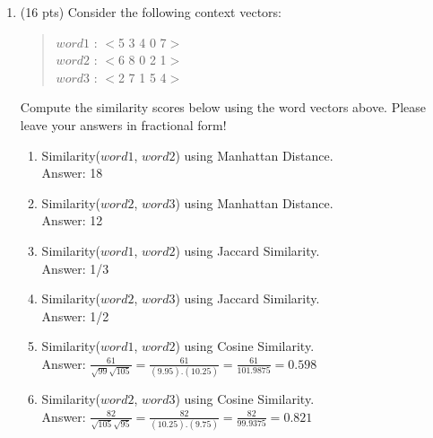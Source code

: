 \documentclass[11pt]{article}
\begin{document}
\begin{enumerate}
\newpage

\item (16 pts) Consider the following context vectors:

\begin{quote}
\hspace*{.5in} $word1$ : $<$5 3 4 0 7$>$ \\
\hspace*{.5in} $word2$ : $<$6 8 0 2 1$>$  \\
\hspace*{.5in} $word3$ : $<$2 7 1 5 4$>$ 
\end{quote}

Compute the similarity scores below using the word
vectors above. Please leave your answers in fractional form!

\begin{enumerate}
\item Similarity($word1$, $word2$) using Manhattan Distance.  \\ Answer: 18\\

\item Similarity($word2$, $word3$) using Manhattan Distance.  \\ Answer: 12 \\

\item Similarity($word1$, $word2$) using Jaccard Similarity.  \\ Answer: 1/3 \\

\item Similarity($word2$, $word3$) using Jaccard Similarity.  \\ Answer: 1/2 \\

\item Similarity($word1$, $word2$) using Cosine Similarity.  \\ Answer: $\frac{61}{\sqrt{99}\sqrt{105}} = \frac{61}{(9.95).(10.25)} = \frac{61}{101.9875} = 0.598 $ \\

\item Similarity($word2$, $word3$) using Cosine Similarity.  \\ Answer: $\frac{82}{\sqrt{105}\sqrt{95}} = \frac{82}{(10.25).(9.75)} = \frac{82}{99.9375} = 0.821$ \\
\end{enumerate}



\end{enumerate}
\end{document}
